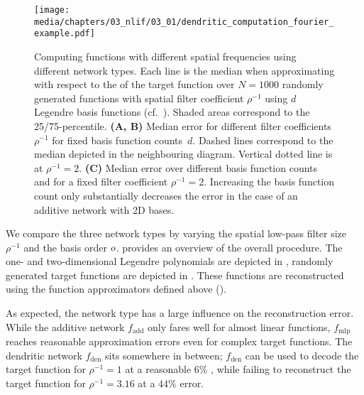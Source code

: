 \begin{figure}
	\texttt{[image: media/chapters/03\_nlif/03\_01/dendritic\_computation\_fourier\_example.pdf]}%
	{\label{fig:dendritic_computation_fourier_example_a}}%
	{\label{fig:dendritic_computation_fourier_example_b}}%
	{\label{fig:dendritic_computation_fourier_example_c}}%
	\caption[Computing functions with different spatial frequencies using different network types]{
	Computing functions with different spatial frequencies using different network types.
	Each line is the median \NRMSE when approximating with respect to the \RMS of the target function over $N = 1000$ randomly generated functions with spatial filter coefficient $\rho^{-1}$ using $d$ Legendre basis functions (cf.~).
	Shaded areas correspond to the 25/75-percentile.
	\textbf{(A, B)}
	Median error for different filter coefficients $\rho^{-1}$ for fixed basis function counts~$d$. Dashed lines correspond to the median depicted in the neighbouring diagram. Vertical dotted line is at $\rho^{-1} = 2$.
	\textbf{(C)}
	Median error over different basis function counts and for a fixed filter coefficient $\rho^{-1} = 2$.
	Increasing the basis function count only substantially decreases the error in the case of an additive network with 2D bases.
	}
	\label{fig:dendritic_computation_fourier_example}
\end{figure}

We compare the three network types by varying the spatial low-pass filter size $\rho^{-1}$ and the basis order $o$.
 provides an overview of the overall procedure.
The one- and two-dimensional Legendre polynomials are depicted in , randomly generated target functions are depicted in .
These functions are reconstructed using the function approximators defined above ().

As expected, the network type has a large influence on the reconstruction error.
While the additive network $f_\mathrm{add}$ only fares well for almost linear functions, $f_\mathrm{mlp}$ reaches reasonable approximation errors even for complex target functions.
The dendritic network $f_\mathrm{den}$ sits somewhere in between;
$f_\mathrm{den}$ can be used to decode the target function for $\rho^{-1} = 1$ at a reasonable $6\%$ \NRMSE, while failing to reconstruct the target function for $\rho^{-1} = 3.16$ at a $44\%$ error.

